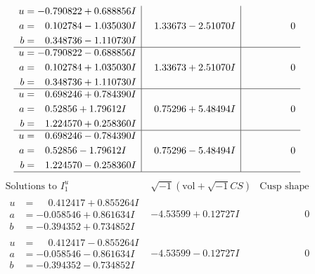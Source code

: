 \documentclass[1p]{elsarticle_modified}
\theoremstyle{definition}
\newcommand{\I}{\sqrt{-1}}
\begin{document}
$$\begin{array}{c|c|c}
\begin{aligned}
u &= -0.790822 + 0.688856 I \\
a &= \phantom{-}0.102784 - 1.035030 I \\
b &= \phantom{-}0.348736 - 1.110730 I\end{aligned}
 & \phantom{-}1.33673 - 2.51070 I & \phantom{-0.000000 } 0 \\ \hline\begin{aligned}
u &= -0.790822 - 0.688856 I \\
a &= \phantom{-}0.102784 + 1.035030 I \\
b &= \phantom{-}0.348736 + 1.110730 I\end{aligned}
 & \phantom{-}1.33673 + 2.51070 I & \phantom{-0.000000 } 0 \\ \hline\begin{aligned}
u &= \phantom{-}0.698246 + 0.784390 I \\
a &= \phantom{-}0.52856 + 1.79612 I \\
b &= \phantom{-}1.224570 + 0.258360 I\end{aligned}
 & \phantom{-}0.75296 + 5.48494 I & \phantom{-0.000000 } 0 \\ \hline\begin{aligned}
u &= \phantom{-}0.698246 - 0.784390 I \\
a &= \phantom{-}0.52856 - 1.79612 I \\
b &= \phantom{-}1.224570 - 0.258360 I\end{aligned}
 & \phantom{-}0.75296 - 5.48494 I & \phantom{-0.000000 } 0\\
 \hline 
 \end{array}$$\newpage$$\begin{array}{c|c|c}  
\text{Solutions to }I^u_{1}& \I (\text{vol} + \sqrt{-1}CS) & \text{Cusp shape}\\
 \hline 
\begin{aligned}
u &= \phantom{-}0.412417 + 0.855264 I \\
a &= -0.058546 + 0.861634 I \\
b &= -0.394352 + 0.734852 I\end{aligned}
 & -4.53599 + 0.12727 I & \phantom{-0.000000 } 0 \\ \hline\begin{aligned}
u &= \phantom{-}0.412417 - 0.855264 I \\
a &= -0.058546 - 0.861634 I \\
b &= -0.394352 - 0.734852 I\end{aligned}
 & -4.53599 - 0.12727 I & \phantom{-0.000000 } 0 \\ \hline\begin{aligned}

\end{aligned}
\end{array}$$
\end{document}
